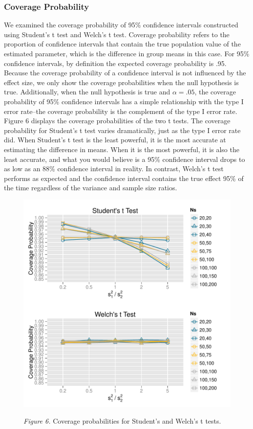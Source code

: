 \documentclass[man,a4paper,noextraspace,apacite]{apa6}
\begin{document}
\subsubsection{Coverage Probability}
We examined the coverage probability of 95\% confidence intervals constructed using Student's t test and Welch's t test. Coverage probability refers to the proportion of confidence intervals that contain the true population value of the estimated parameter, which is the difference in group means in this case. For 95\% confidence intervals, by definition the expected coverage probability is .95. Because the coverage probability of a confidence interval is not influenced by the effect size, we only show the coverage probabilities when the null hypothesis is true. Additionally, when the null hypothesis is true and $\alpha = .05$, the coverage probability of 95\% confidence intervals has a simple relationship with the type I error rate--the coverage probability is the complement of the type I error rate. Figure 6 displays the coverage probabilities of the two t tests. The coverage probability for Student's t test varies dramatically, just as the type I error rate did. When Student's t test is the least powerful, it is the most accurate at estimating the difference in means. When it is the most powerful, it is also the least accurate, and what you would believe is a 95\% confidence interval drops to as low as an 88\% confidence interval in reality. In contrast, Welch's t test performs as expected and the confidence interval contains the true effect 95\% of the time regardless of the variance and sample size ratios. 




\begin{figure}
\includegraphics{WelchManuscript-MASTER-CoveragePlots}

\textit{Figure 6.} Coverage probabilities for Student's and Welch's t tests.
\end{figure}
\end{document}
